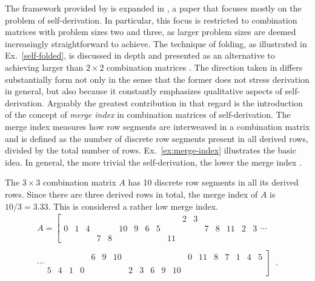 The framework provided by \cite{Starr1984} is expanded in \cite{Kowalski1987a}, a paper that focuses mostly on the problem of self-derivation. In particular, this focus is restricted to combination matrices with problem sizes two and three, as larger problem sizes are deemed increasingly straightforward to achieve. The technique of folding, as illustrated in Ex.~\ref{self-folded}, is discussed in depth and presented as an alternative to achieving larger than $2 \times 2$ combination matrices \cite[298]{Kowalski1987a}. The direction taken in \cite{Kowalski1987a} differs substantially form \cite{Starr1984} not only in the sense that the former does not stress derivation in general, but also because it constantly emphasizes qualitative aspects of self-derivation. Arguably the greatest contribution in that regard is the introduction of the concept of \emph{merge index} in combination matrices of self-derivation. The merge index measures how row segments are interweaved in a combination matrix and is defined as the number of discrete row segments present in all derived rows, divided by the total number of rows. Ex.~\ref{ex:merge-index} illustrates the basic idea. In general, the more trivial the self-derivation, the lower the merge index \cite[310]{Kowalski1987a}.

\begin{example}
	\cite[314]{Kowalski1987a}
	\label{ex:merge-index}
    The $3 \times 3$ combination matrix $A$ has 10 discrete row segments in all its derived rows. Since there are three derived rows in total, the merge index of $A$ is $10 / 3 = 3.33$. This is considered a rather low merge index.
    \begin{multline}
        A = \left[
        \begin{array}{cccccccccccc|ccccc}
        &&&&&&&&&& 2 & 3 &&&&& \\
        0 & 1 & 4 &&& 10 & 9 & 6 & 5 &&&& 7 & 8 & 11 & 2 & 3 \\
        &&& 7 & 8 &&&&& 11 &&&&&&&
        \end{array}
        \right. \cdots \\\\
        \cdots \left.
        \begin{array}{ccccccc|cccccccccccc}
        &&&& 6 & 9 & 10 &&&&&& 0 & 11 & 8 & 7 & 1 & 4 & 5 \\
        &&&&&&&&&&&&&&&&&& \\
        5 & 4 & 1 & 0 &&&& 2 & 3 & 6 & 9 & 10 &&&&&&&
        \end{array}
        \right] \enspace.
    \end{multline}
\end{example}

